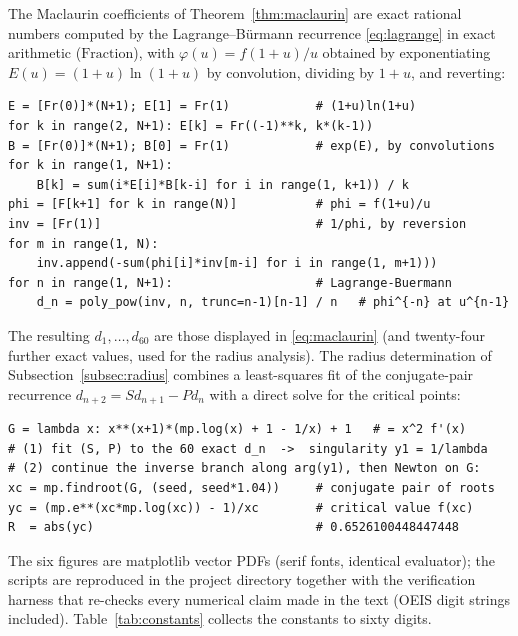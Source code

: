 The Maclaurin coefficients of Theorem~\ref{thm:maclaurin} are exact
rational numbers computed by the Lagrange--B\"urmann recurrence
\eqref{eq:lagrange} in exact arithmetic ($\mathrm{Fraction}$), with
$\varphi(u) = f(1+u)/u$ obtained by exponentiating
$E(u) = (1+u)\ln(1+u)$ by convolution, dividing by $1+u$, and
reverting:

\begin{small}
\begin{verbatim}
E = [Fr(0)]*(N+1); E[1] = Fr(1)            # (1+u)ln(1+u)
for k in range(2, N+1): E[k] = Fr((-1)**k, k*(k-1))
B = [Fr(0)]*(N+1); B[0] = Fr(1)            # exp(E), by convolutions
for k in range(1, N+1):
    B[k] = sum(i*E[i]*B[k-i] for i in range(1, k+1)) / k
phi = [F[k+1] for k in range(N)]           # phi = f(1+u)/u
inv = [Fr(1)]                              # 1/phi, by reversion
for m in range(1, N):
    inv.append(-sum(phi[i]*inv[m-i] for i in range(1, m+1)))
for n in range(1, N+1):                    # Lagrange-Buermann
    d_n = poly_pow(inv, n, trunc=n-1)[n-1] / n   # phi^{-n} at u^{n-1}
\end{verbatim}
\end{small}

\noindent The resulting $d_{1}, \ldots, d_{60}$ are those displayed in
\eqref{eq:maclaurin} (and twenty-four further exact values, used for
the radius analysis). The radius determination of
Subsection~\ref{subsec:radius} combines a least-squares fit of the
conjugate-pair recurrence $d_{n+2} = S d_{n+1} - P d_{n}$ with a direct
solve for the critical points:

\begin{small}
\begin{verbatim}
G = lambda x: x**(x+1)*(mp.log(x) + 1 - 1/x) + 1   # = x^2 f'(x)
# (1) fit (S, P) to the 60 exact d_n  ->  singularity y1 = 1/lambda
# (2) continue the inverse branch along arg(y1), then Newton on G:
xc = mp.findroot(G, (seed, seed*1.04))     # conjugate pair of roots
yc = (mp.e**(xc*mp.log(xc)) - 1)/xc        # critical value f(xc)
R  = abs(yc)                               # 0.6526100448447448
\end{verbatim}
\end{small}

\noindent The six figures are matplotlib vector PDFs (serif fonts,
identical evaluator); the scripts are reproduced in the project
directory together with the verification harness that re-checks every
numerical claim made in the text (OEIS digit strings included).
Table~\ref{tab:constants} collects the constants to sixty digits.

